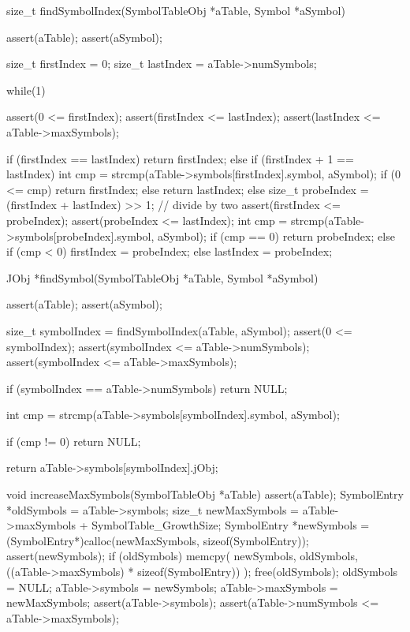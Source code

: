 size_t findSymbolIndex(SymbolTableObj *aTable,  Symbol *aSymbol) {
  assert(aTable);
  assert(aSymbol);
  
  size_t firstIndex = 0;
  size_t lastIndex  = aTable->numSymbols;
  
  while(1) {
    assert(0 <= firstIndex);
    assert(firstIndex <= lastIndex);
    assert(lastIndex  <= aTable->maxSymbols);
    
    if (firstIndex == lastIndex) {
      return firstIndex;
    } else if (firstIndex + 1 == lastIndex) {
      int cmp = strcmp(aTable->symbols[firstIndex].symbol, aSymbol);
      if (0 <= cmp) {
        return firstIndex;
      } else {
        return lastIndex;
      }
    } else {
      size_t probeIndex = (firstIndex + lastIndex) >> 1; // divide by two
      assert(firstIndex <= probeIndex);
      assert(probeIndex <= lastIndex);
      int cmp = strcmp(aTable->symbols[probeIndex].symbol, aSymbol);
      if (cmp == 0) {
        return probeIndex;
      } else if (cmp < 0) {
        firstIndex = probeIndex;
      } else {
        lastIndex = probeIndex;
      }
    }
  }  
}

JObj *findSymbol(SymbolTableObj *aTable, Symbol *aSymbol) {  
  assert(aTable);
  assert(aSymbol);
  
  size_t symbolIndex = findSymbolIndex(aTable, aSymbol);
  assert(0 <= symbolIndex);
  assert(symbolIndex <= aTable->numSymbols);
  assert(symbolIndex <= aTable->maxSymbols);
    
  if (symbolIndex == aTable->numSymbols) return NULL;
  
  int cmp = strcmp(aTable->symbols[symbolIndex].symbol, aSymbol);
  
  if (cmp != 0) return NULL;
  
  return aTable->symbols[symbolIndex].jObj;
}

void increaseMaxSymbols(SymbolTableObj *aTable) {
  assert(aTable);
  SymbolEntry *oldSymbols = aTable->symbols;
  size_t newMaxSymbols    = aTable->maxSymbols + SymbolTable_GrowthSize;
  SymbolEntry *newSymbols =
    (SymbolEntry*)calloc(newMaxSymbols, sizeof(SymbolEntry));
  assert(newSymbols);
  if (oldSymbols) {
    memcpy(
      newSymbols,
      oldSymbols,
      ((aTable->maxSymbols) * sizeof(SymbolEntry))
    );
    free(oldSymbols);
    oldSymbols = NULL;
  }
  aTable->symbols    = newSymbols;
  aTable->maxSymbols = newMaxSymbols;
  assert(aTable->symbols);
  assert(aTable->numSymbols <= aTable->maxSymbols);
}

